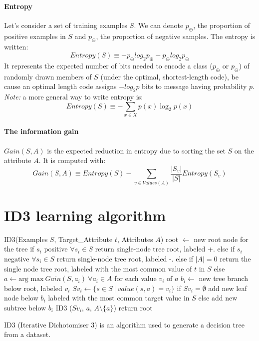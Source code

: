 \paragraph{Entropy} Let's consider a set of training examples $S$. We can denote $p_{\oplus}$, the proportion of positive examples in $S$ and $p_{\ominus}$, the proportion of negative samples. The entropy is written:
\begin{equation*}
    Entropy(S) \equiv -p_{\oplus} log_2 p_{\oplus} - p_{\ominus} log_2 p_{\ominus}    
\end{equation*}
It represents the expected number of bits needed to encode a class ($p_{\oplus}$ or $p_{\ominus}$) of randomly drawn members of $S$ (under the optimal, shortest-length code), be cause an optimal length code assigns $-log_2 p$ bits to message having probability $p$. \\
\linebreak
\textit{Note:} a more general way to write entropy is:
\begin{equation*}
    Entropy(S) \equiv - \sum_{x \in X} p(x) \log_{2} p(x)     
\end{equation*}

\paragraph{The information gain} $Gain(S, A)$ is the expected reduction in entropy due to sorting the set $S$ on the attribute $A$. It is computed with:
\begin{equation*}
    Gain(S, A) \equiv Entropy(S) - \sum_{v \in  Values(A)} \frac{|S_v|}{|S|} Entropy(S_v)    
\end{equation*}

\section{ID3 learning algorithm}
\begin{algorithm}[caption={ID3.}, label={alg10}]
ID3(Examples $S$, Target_Attribute $t$, Attributes $A$)
    root $\leftarrow$ new root node for the tree
    if $s_i$ positive $\forall s_i \in S$
        return single-node tree root, labeled +.
    else if $s_i$ negative $\forall s_i \in S$
        return single-node tree root, labeled -.
    else if $|A| = 0$    
        return the single node tree root, labeled with the most common value of $t$ in $S$
    else
        $a \leftarrow \text{arg~max}~Gain(S, a_i) ~ \forall a_i \in A$
        for each value $v_i$ of $a$
            $b_i \leftarrow $ new tree branch below root, labeled $v_i$
            $Sv_i \leftarrow \{ s \in S ~|~ value(s, a) = v_i \}$ 
            if $Sv_i = \emptyset$
                add new leaf node below $b_i$ labeled with the most common target value in $S$
            else
                add new subtree below $b_i$ ID3 ($Sv_i$, $a$, $A \setminus \{a\}$)
    return root

\end{algorithm}
ID3 (Iterative Dichotomiser 3) is an algorithm used to generate a decision tree from a dataset. 
